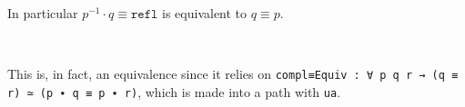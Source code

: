 \begin{code}[hide]%
%
\>[2]\<%
\end{code}
In particular $p^{-1} \cdot q \equiv \texttt{refl}$ is equivalent to $q \equiv p$.
\begin{code}%
%
\>[2]\AgdaSpace{}%
\AgdaSymbol{:}%
\>[1205I]\AgdaSymbol{\{}\AgdaSpace{}%
\AgdaSymbol{:}\AgdaSpace{}%
\AgdaSymbol{\}}\AgdaSpace{}%
\AgdaSymbol{\{}\AgdaSpace{}%
\AgdaSpace{}%
\AgdaSymbol{:}\AgdaSpace{}%
\AgdaSymbol{\}}\AgdaSpace{}%
\<%
\\
\>[.][@{}l@{}]\<[1205I]%
\>[15]\AgdaSymbol{(}\AgdaSpace{}%
\AgdaSpace{}%
\AgdaSymbol{:}\AgdaSpace{}%
\AgdaSpace{}%
\AgdaSpace{}%
\AgdaSymbol{)}\AgdaSpace{}%
\AgdaSpace{}%
\AgdaSymbol{(}\AgdaSpace{}%
\AgdaSpace{}%
\AgdaSpace{}%
\AgdaSpace{}%
\AgdaSpace{}%
\AgdaSymbol{)}\AgdaSpace{}%
\AgdaSpace{}%
\AgdaSymbol{(}\AgdaSpace{}%
\AgdaSpace{}%
\AgdaSymbol{)}\<%
\end{code}
This is, in fact, an equivalence since it relies on
\texttt{compl≡Equiv : ∀ p q r → (q ≡ r) ≃ (p ∙ q ≡ p ∙ r)}, which is made into a
path with \texttt{ua}.
